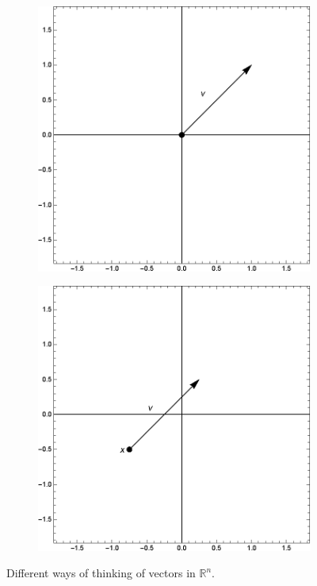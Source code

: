 \begin{figure}[h!]
\centering
\begin{subfigure}[b]{0.5\textwidth}
\includegraphics[scale=0.55]{fig/chp2-fig0-a}
\end{subfigure}%
\begin{subfigure}[b]{0.5\textwidth}
\includegraphics[scale=0.55]{fig/chp2-fig0-b}
\end{subfigure}
\caption{Different ways of thinking of vectors in $\mathbb{R}^n$.}
\label{fig:chp2-fig1-vects}
\end{figure}

